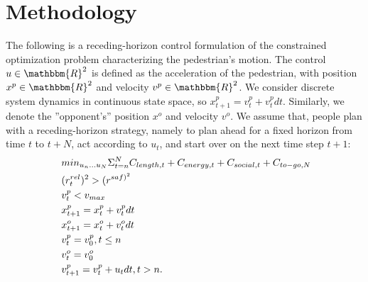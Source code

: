 \documentclass[conference]{IEEEtran}
\begin{document}
\section{Methodology}
\vspace{-0.1em}
The following is a receding-horizon control formulation of the constrained 
optimization problem characterizing the pedestrian's motion. The control 
$u \in \mathbbm{R}^2$ 
is defined as the acceleration of the pedestrian, with 
position $x^p \in \mathbbm{R}^2$ and velocity $v^p \in \mathbbm{R}^2$. We  
consider
discrete system dynamics in continuous state space, so $x_{t+1}^p = v_t^p + v_t^p dt$.
Similarly, we denote the ''opponent's'' position $x^o$ and velocity $v^o$. We assume that, 
people plan with a receding-horizon strategy, namely to plan ahead for a fixed 
horizon from time $t$ to $t+N$, act according to $u_t$, and start over on the 
next time step $t+1$:
\begin{equation}~\label{eq:receding_control}
  \begin{aligned}
    &min_{u_n \dots u_N} \Sigma^N_{t=n} \small{C_{length,t} + C_{energy,t} + C_{social,t}} + C_{to-go,N}\\
    & (r^{rel}_t)^2 > (r^{{saf})^2}\\
    & v^p_t < v_{max}\\
    & x^p_{t+1} = x^p_t + v^p_t \scriptsize{d}t\\
    & x^o_{t+1} = x^o_t + v^o_t \scriptsize{d}t\\
    & v^p_t = v^p_0, t \leq n\\
    & v^o_t = v^o_0\\
    & v^p_{t+1} = v^p_t + u_t \scriptsize{d}t, t>n.
 \end{aligned}
\end{equation}
\end{document}
